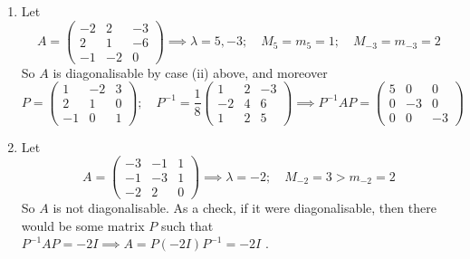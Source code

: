 \begin{enumerate}
	\item Let
	      \[
		      A = \begin{pmatrix}
			      -2 & 2 & -3 \\ 2 & 1 & -6 \\ -1 & -2 & 0
		      \end{pmatrix} \implies \lambda = 5, -3;\quad M_5=m_5=1;\quad M_{-3}=m_{-3}=2
	      \]
	      So \(A\) is diagonalisable by case (ii) above, and moreover
	      \[
		      P = \begin{pmatrix}
			      1  & -2 & 3 \\
			      2  & 1  & 0 \\
			      -1 & 0  & 1
		      \end{pmatrix};\quad P^{-1} = \frac{1}{8}\begin{pmatrix}
			      1  & 2 & -3 \\
			      -2 & 4 & 6  \\
			      1  & 2 & 5
		      \end{pmatrix} \implies P^{-1}AP = \begin{pmatrix}
			      5 & 0  & 0  \\
			      0 & -3 & 0  \\
			      0 & 0  & -3
		      \end{pmatrix}
	      \]
	\item Let
	      \[
		      A = \begin{pmatrix}
			      -3 & -1 & 1 \\
			      -1 & -3 & 1 \\
			      -2 & 2  & 0
		      \end{pmatrix} \implies \lambda = -2;\quad M_{-2}=3 > m_{-2} = 2
	      \]
	      So \(A\) is not diagonalisable.
	      As a check, if it were diagonalisable, then there would be some matrix \(P\) such that \(P^{-1}AP = -2I \implies A = P(-2I)P^{-1} = -2I\) \contradiction.
\end{enumerate}

